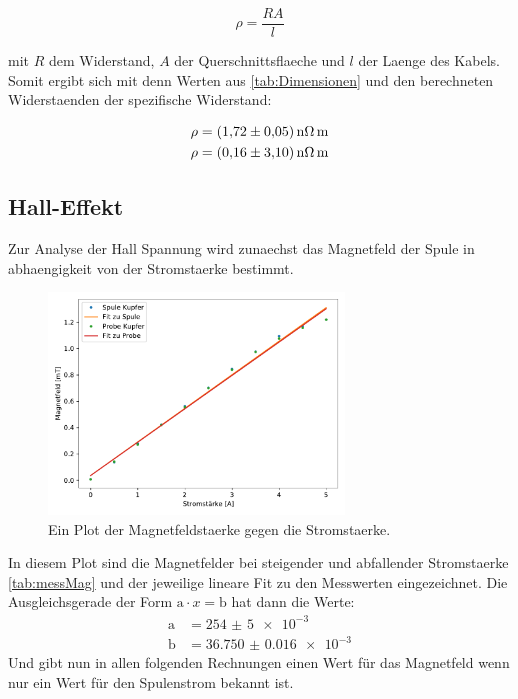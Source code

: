     \begin{equation}
        \rho = \frac{RA}{l}
    \end{equation}

    mit $R$ dem Widerstand, $A$ der Querschnittsflaeche und $l$ der Laenge des Kabels.
    Somit ergibt sich mit denn Werten aus \ref{tab:Dimensionen} und den berechneten Widerstaenden der spezifische Widerstand:

    \begin{align}
        \rho &= \SI{1.72+-0.05}{\nano\ohm\meter}\\
        \rho &= \SI{0.16+-03.1}{\nano\ohm\meter}
    \end{align}

    \subsection{Hall-Effekt}
    Zur Analyse der Hall Spannung wird zunaechst das Magnetfeld der Spule in abhaengigkeit von der Stromstaerke bestimmt.

    \begin{figure}[H]
        \centering
        \includegraphics[width=0.7\textwidth]{build/Magnetfeld.pdf}
        \caption{Ein Plot der Magnetfeldstaerke gegen die Stromstaerke.}
        \label{img:Magnetfeld}
    \end{figure}

    In diesem Plot sind die Magnetfelder bei steigender und abfallender Stromstaerke \ref{tab:messMag} und der jeweilige lineare Fit zu den 
    Messwerten eingezeichnet.
    Die Ausgleichsgerade der Form $\text{a}\cdot x = \text{b}$ hat dann die Werte:
    \begin{align}
        \text{a} & = \num{254(5)e-3}\\
        \text{b} & = \num{36.750(16)e-3}
    \end{align}
    Und gibt nun in allen folgenden Rechnungen einen Wert für das Magnetfeld wenn nur ein Wert für den Spulenstrom bekannt ist.

